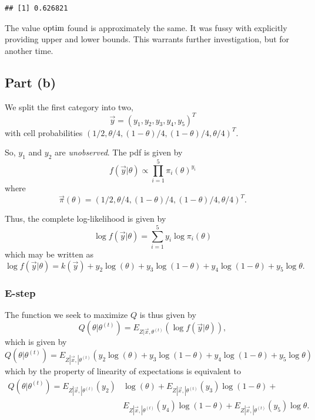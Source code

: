 \documentclass[
]{article}
\begin{document}
\begin{verbatim}
## [1] 0.626821
\end{verbatim}

The value \(\rm{optim}\) found is approximately the same. It was fussy
with explicitly providing upper and lower bounds. This warrants further
investigation, but for another time.

\hypertarget{part-b-1}{%
\subsection{Part (b)}\label{part-b-1}}


We split the first category into two, \[
  \vec{y} = (y_1, y_2, y_3, y_4, y_5)^T
\] with cell probabilities \((1/2, θ/4,(1 − θ)/4,(1 − θ)/4, θ/4)^T\).

So, \(y_1\) and \(y_2\) are \emph{unobserved}. The pdf is given by \[
  f(\vec{y}|\theta) \propto \prod_{i=1}^{5} \pi_i(\theta)^{y_i}
\] where \[
  \vec{\pi}(\theta) = (1/2, θ/4,(1 − θ)/4,(1 − θ)/4, θ/4)^T.
\]

Thus, the complete log-likelihood is given by \[
  \log f(\vec{y} | \theta) = \sum_{i=1}^{5} y_i \log \pi_i(\theta)
\] which may be written as \[
  \log f(\vec{y} | \theta) = k(\vec{y}) + y_2 \log(\theta) + y_3 \log(1-\theta) + y_4 \log(1-\theta) + y_5 \log \theta.
\]

\hypertarget{e-step}{%
\subsubsection{E-step}\label{e-step}}

The function we seek to maximize \(Q\) is thus given by \[
  Q(\theta|\theta^{(t)}) = E_{Z|\vec{x},\theta^{(t)}}(\log f(\vec{y}|\theta)),
\] which is given by \[
  Q(\theta|\theta^{(t)})= E_{Z|\vec{x},|\theta^{(t)}}\left(y_2 \log(\theta) + y_3 \log(1-\theta) + y_4 \log(1-\theta) + y_5 \log \theta\right)
\] which by the property of linearity of expectations is equivalent to
\begin{equation}
\begin{split}
Q(\theta|\theta^{(t)})
  = E_{Z|\vec{x},|\theta^{(t)}}(y_2) & \log(\theta) + E_{Z|\vec{x},|\theta^{(t)}}(y_3) \log(1-\theta) +\\
    & E_{Z|\vec{x},|\theta^{(t)}}(y_4) \log(1-\theta) + E_{Z|\vec{x},|\theta^{(t)}}(y_5) \log \theta.
\end{split}
\end{equation}
\end{document}
